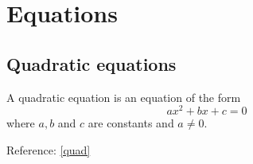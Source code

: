 \chapter{Equations}

\section{Quadratic equations}
\begin{dfn}
    A quadratic equation is an equation of the form
    \begin{equation}
        \label{quad}
        ax^2 + bx + c = 0
    \end{equation}
    where \( a, b \) and \( c \) are constants
    and \( a \neq 0 \).
\end{dfn}
Reference: \ref{quad}
